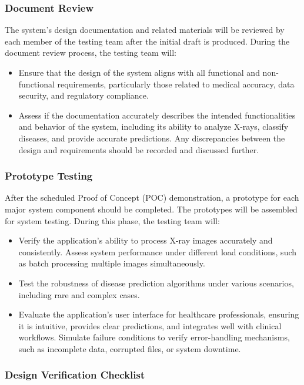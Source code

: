 \documentclass[12pt, titlepage]{article}
\begin{document}
\subsubsection{Document Review}
The system's design documentation and related materials will be reviewed by each member of the testing team after the initial draft is produced. During the document review process, the testing team will:
\begin{itemize}
\item Ensure that the design of the system aligns with all functional and non-functional requirements, particularly those related to medical accuracy, data security, and regulatory compliance.
\item Assess if the documentation accurately describes the intended functionalities and behavior of the system, including its ability to analyze X-rays, classify diseases, and provide accurate predictions. Any discrepancies between the design and requirements should be recorded and discussed further.
\end{itemize}

\subsubsection{Prototype Testing}
After the scheduled Proof of Concept (POC) demonstration, a prototype for each major system component should be completed. The prototypes will be assembled for system testing. During this phase, the testing team will:
\begin{itemize}
\item Verify the application’s ability to process X-ray images accurately and consistently.
Assess system performance under different load conditions, such as batch processing multiple images simultaneously.
\item Test the robustness of disease prediction algorithms under various scenarios, including rare and complex cases.
\item Evaluate the application's user interface for healthcare professionals, ensuring it is intuitive, provides clear predictions, and integrates well with clinical workflows.
Simulate failure conditions to verify error-handling mechanisms, such as incomplete data, corrupted files, or system downtime.
\end{itemize}


\subsubsection{Design Verification Checklist}
\end{document}

